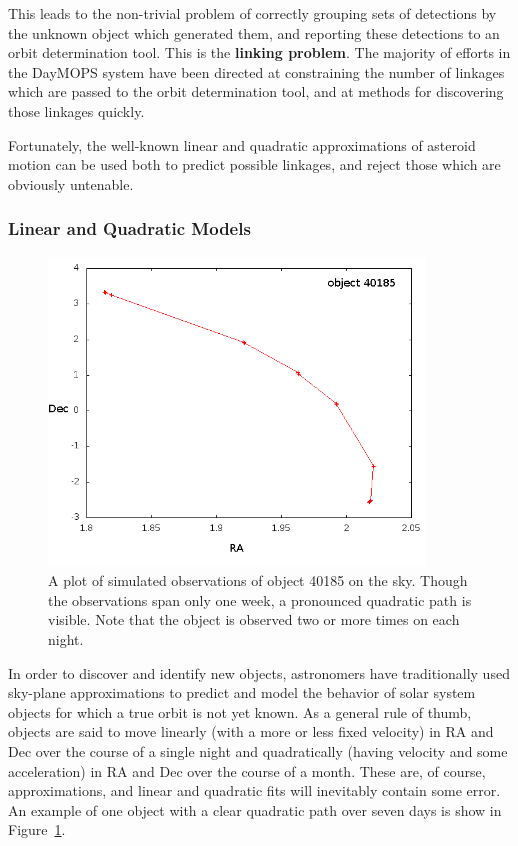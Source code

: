 This leads to the non-trivial problem of correctly grouping sets of
detections by the unknown object which generated them, and reporting
these detections to an orbit determination tool.  This is the \textbf{
  linking problem}.  The majority of efforts in the DayMOPS system
have been directed at constraining the number of linkages which are
passed to the orbit determination tool, and at methods for discovering
those linkages quickly.

Fortunately, the well-known linear and quadratic approximations of asteroid
motion can be used both to predict possible linkages, and reject those
which are obviously untenable.  

\subsubsection{Linear and Quadratic Models}

\begin{figure}[ht]
  \centering
    \includegraphics[width=10cm]{illustrations/4.png}
    \caption{ A plot of simulated observations of object 40185 on the
      sky.  Though the observations span only one week, a pronounced
      quadratic path is visible.  Note that the object is observed two
      or more times on each night.}
\label{objectPlotted}
\end{figure}



In order to discover and identify new objects, astronomers have
traditionally used sky-plane approximations to predict and model the
behavior of solar system objects for which a true orbit is not yet
known.  As a general rule of thumb, objects are said to move linearly
(with a more or less fixed velocity) in RA and Dec over the course of
a single night and quadratically (having velocity and some
acceleration) in RA and Dec over the course of a month.  These are, of
course, approximations, and linear and quadratic fits will inevitably
contain some error.  An example of one object with a clear quadratic
path over seven days is show in Figure~\ref{objectPlotted}.


